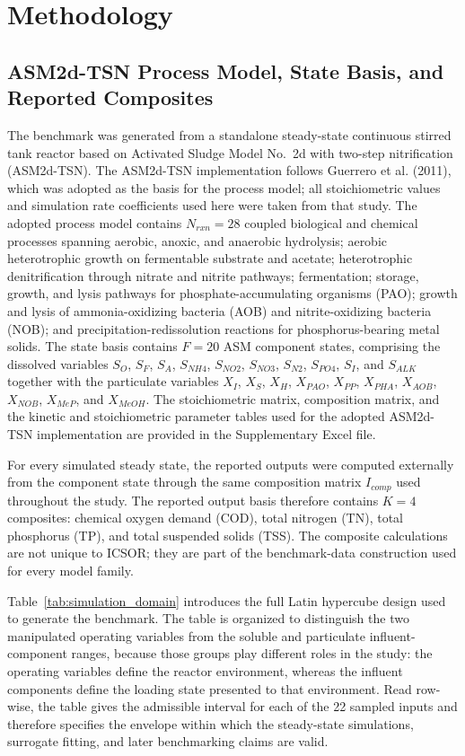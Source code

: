 \documentclass[a4paper,fleqn]{cas-sc}
\newcommand{\rev}[1]{\textcolor{revDefault}{#1}}
\newenvironment{revblock}{\begingroup\color{revDefault}}{\endgroup}
\begin{document}
\section{\rev{Methodology}}
\begin{revblock}

\subsection{ASM2d-TSN Process Model, State Basis, and Reported Composites}

The benchmark was generated from a standalone steady-state continuous stirred tank reactor based on Activated Sludge Model No.\ 2d with two-step nitrification (ASM2d-TSN). The ASM2d-TSN implementation follows Guerrero et al. (2011), which was adopted as the basis for the process model; all stoichiometric values and simulation rate coefficients used here were taken from that study. The adopted process model contains $N_{rxn}=28$ coupled biological and chemical processes spanning aerobic, anoxic, and anaerobic hydrolysis; aerobic heterotrophic growth on fermentable substrate and acetate; heterotrophic denitrification through nitrate and nitrite pathways; fermentation; storage, growth, and lysis pathways for phosphate-accumulating organisms (PAO); growth and lysis of ammonia-oxidizing bacteria (AOB) and nitrite-oxidizing bacteria (NOB); and precipitation-redissolution reactions for phosphorus-bearing metal solids. The state basis contains $F=20$ ASM component states, comprising the dissolved variables $S_O$, $S_F$, $S_A$, $S_{NH4}$, $S_{NO2}$, $S_{NO3}$, $S_{N2}$, $S_{PO4}$, $S_I$, and $S_{ALK}$ together with the particulate variables $X_I$, $X_S$, $X_H$, $X_{PAO}$, $X_{PP}$, $X_{PHA}$, $X_{AOB}$, $X_{NOB}$, $X_{MeP}$, and $X_{MeOH}$. The stoichiometric matrix, composition matrix, and the kinetic and stoichiometric parameter tables used for the adopted ASM2d-TSN implementation are provided in the Supplementary Excel file.

For every simulated steady state, the reported outputs were computed externally from the component state through the same composition matrix $I_{comp}$ used throughout the study. The reported output basis therefore contains $K=4$ composites: chemical oxygen demand (COD), total nitrogen (TN), total phosphorus (TP), and total suspended solids (TSS). The composite calculations are not unique to ICSOR; they are part of the benchmark-data construction used for every model family.

Table~\ref{tab:simulation_domain} introduces the full Latin hypercube design used to generate the benchmark. The table is organized to distinguish the two manipulated operating variables from the soluble and particulate influent-component ranges, because those groups play different roles in the study: the operating variables define the reactor environment, whereas the influent components define the loading state presented to that environment. Read row-wise, the table gives the admissible interval for each of the 22 sampled inputs and therefore specifies the envelope within which the steady-state simulations, surrogate fitting, and later benchmarking claims are valid.


\end{revblock}
\end{document}
